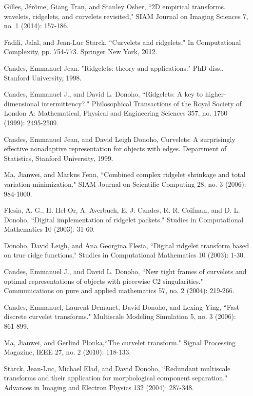 \documentclass{UCF_ETD}
\begin{document}
\begin{thebibliography}{99}
Gilles, Jérôme, Giang Tran, and Stanley Osher, ``2D empirical transforms. wavelets, ridgelets, and curvelets revisited," SIAM Journal on Imaging Sciences 7, no. 1 (2014): 157-186.

Fadili, Jalal, and Jean-Luc Starck. ``Curvelets and ridgelets," In Computational Complexity, pp. 754-773. Springer New York, 2012.

Candes, Emmanuel Jean. "Ridgelets: theory and applications." PhD diss., Stanford University, 1998.

Candes, Emmanuel J., and David L. Donoho, ``Ridgelets: A key to higher-dimensional intermittency?." Philosophical Transactions of the Royal Society of London A: Mathematical, Physical and Engineering Sciences 357, no. 1760 (1999): 2495-2509.

Candes, Emmanuel Jean, and David Leigh Donoho, Curvelets: A surprisingly effective nonadaptive representation for objects with edges. Department of Statistics, Stanford University, 1999.

Ma, Jianwei, and Markus Fenn, ``Combined complex ridgelet shrinkage and total variation minimization," SIAM Journal on Scientific Computing 28, no. 3 (2006): 984-1000.

Flesia, A. G., H. Hel-Or, A. Averbuch, E. J. Candes, R. R. Coifman, and D. L. Donoho, ``Digital implementation of ridgelet packets." Studies in Computational Mathematics 10 (2003): 31-60.

Donoho, David Leigh, and Ana Georgina Flesia, ``Digital ridgelet transform based on true ridge functions," Studies in Computational Mathematics 10 (2003): 1-30.

Candes, Emmanuel J., and David L. Donoho, ``New tight frames of curvelets and optimal representations of objects with piecewise C2 singularities." Communications on pure and applied mathematics 57, no. 2 (2004): 219-266.

Candes, Emmanuel, Laurent Demanet, David Donoho, and Lexing Ying, ``Fast discrete curvelet transforms." Multiscale Modeling  Simulation 5, no. 3 (2006): 861-899.

Ma, Jianwei, and Gerlind Plonka,``The curvelet transform." Signal Processing Magazine, IEEE 27, no. 2 (2010): 118-133.

Starck, Jean-Luc, Michael Elad, and David Donoho, ``Redundant multiscale transforms and their application for morphological component separation." Advances in Imaging and Electron Physics 132 (2004): 287-348.


\end{thebibliography}
\end{document}
